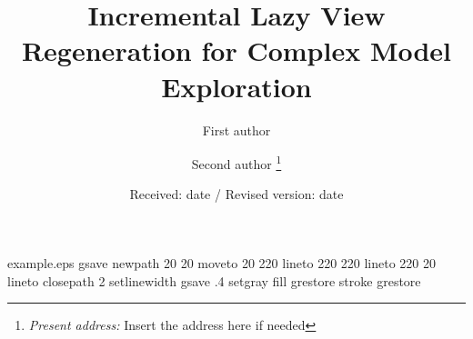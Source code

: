 %
%
%
%
\begin{filecontents*}{example.eps}
gsave
newpath
  20 20 moveto
  20 220 lineto
  220 220 lineto
  220 20 lineto
closepath
2 setlinewidth
gsave
  .4 setgray fill
grestore
stroke
grestore
\end{filecontents*}
%
\documentclass[global,twocolumn]{svjour}
%
\usepackage{graphicx}

%
%

%
\title{Incremental Lazy View Regeneration for Complex Model Exploration}
\author{First author \and Second author%
\thanks{\emph{Present address:} Insert the address here if needed}%
}                     %
%
\offprints{}          %
%
%
\date{Received: date / Revised version: date}
%
\maketitle
%
\begin{abstract}
Insert your abstract here.
\end{abstract}
%
\section{Introduction}
\label{introduction}
Your text comes here. Separate text sections with


